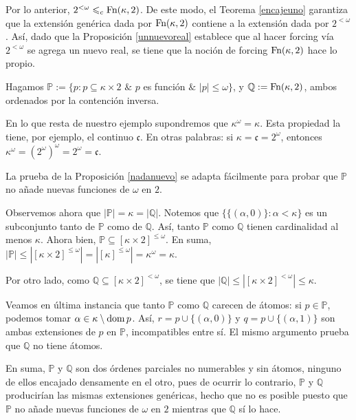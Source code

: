 \documentclass[11pt]{unam_tesis1}
\theoremstyle{MyThmStyle}
\theoremstyle{definition}
\theoremstyle{plain}
\theoremstyle{remark}
\def\dom{\mathop{\rm dom}\nolimits}
\let\leq\leqslant
\begin{document}
Por lo anterior, $2^{<\omega}\leq_c {\rm Fn(\kappa,2)}$. De este modo, el Teorema \ref{encajeuno} garantiza que la extensi\'on gen\'erica dada por ${\rm Fn(\kappa,2)}$ contiene a la extensi\'on dada por $2^{<\omega}$. As\'i, dado que la Proposici\'on \ref{unnuevoreal} establece que al hacer forcing v\'ia $2^{<\omega}$ se agrega un nuevo real, se tiene que la noci\'on de forcing ${\rm Fn(\kappa,2)}$ hace lo propio.

Hagamos $\mathbb P:=\{ p : p \subseteq \kappa \times 2$ $\&$ $p$ es funci\'on $\&$ $|p| \leq \omega\}$, y $\mathbb Q:={\rm Fn}(\kappa,2)$, ambos ordenados por la contenci\'on inversa.

En lo que resta de nuestro ejemplo supondremos que $\kappa^\omega = \kappa$. Esta propiedad la tiene, por ejemplo, el continuo $\mathfrak{c}$. En otras palabras: si $\kappa=\mathfrak{c}=2^{\omega}$, entonces $\kappa^{\omega}=(2^{\omega})^{\omega}=2^{\omega}=\mathfrak{c}$.

La prueba de la Proposici\'on \ref{nadanuevo} se adapta f\'acilmente para probar que $\mathbb P$ no a\~nade nuevas funciones de $\omega$ en $2$.

Observemos ahora que $|\mathbb P|=\kappa=|\mathbb Q|$. Notemos que $\{\{(\alpha,0) \}:\alpha<\kappa \}$ es un subconjunto tanto de $\mathbb P$ como de $\mathbb Q$. As\'i, tanto  $\mathbb P$ como $\mathbb Q$ tienen cardinalidad al menos $\kappa$. Ahora bien, $\mathbb P\subseteq [\kappa\times 2]^{\leq \omega}$. En suma, $|\mathbb P|\leq |[\kappa\times 2]^{\leq \omega}|=|[\kappa]^{\leq \omega}|=\kappa^\omega=\kappa$.

Por otro lado, como $\mathbb Q\subseteq [\kappa\times 2]^{<\omega}$, se tiene que $|\mathbb Q|\leq |[\kappa\times 2]^{<\omega}|\leq\kappa$.

Veamos en \'ultima instancia que tanto $\mathbb P$ como $\mathbb Q$ carecen de \'atomos: si $p\in \mathbb P$, podemos tomar $\alpha\in \kappa\setminus \dom p$. As\'i, $r=p\cup \{(\alpha,0)\}$ y $q=p\cup \{(\alpha,1)\}$ son ambas extensiones de $p$ en $\mathbb P$, incompatibles entre s\'i. El mismo argumento prueba que $\mathbb Q$ no tiene \'atomos.

En suma, $\mathbb P$ y $\mathbb Q$ son dos \'ordenes parciales no numerables y sin \'atomos, ninguno de ellos encajado densamente en el otro, pues de ocurrir lo contrario, $\mathbb P$ y $\mathbb Q$ producir\'ian las mismas extensiones gen\'ericas, hecho que no es posible puesto que $\mathbb P$ no a\~nade nuevas funciones de $\omega$ en $2$ mientras que $\mathbb Q$ s\'i lo hace.
\end{document}
